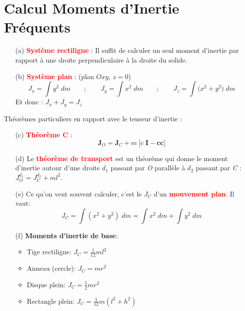 \documentclass[a4paper]{article}
\begin{document}
\section{Calcul Moments d'Inertie Fréquents}





\begin{enumerate}

\item[(a)] \textcolor{red}{\textbf{Système rectiligne}} : Il suffit de calculer un seul moment d'inertie par rapport à une droite perpendiculaire à la droite du solide.

\item[(b)] \textcolor{red}{\textbf{Système plan}} : (plan $ Oxy $, $ z = 0 $)
\[ J_x = \int y^2 \; d m \qquad ; \qquad J_y = \int x^2 \; d m \qquad ; \qquad J_z = \int \Big( x^2 + y^2 \Big) \; d m \]
Et donc : $\displaystyle J_x + J_y = J_z $

\end{enumerate}





Théorèmes particuliers en rapport avec le tenseur d'inertie : 
\begin{enumerate}

\item[(c)] \textcolor{red}{\textbf{Théorème C}} : 
\[ \textbf{J}_O = \textbf{J}_C + m \; \Big[ c \; \textbf{I} - \textbf{c} \textbf{c} \Big] \]

\item[(d)] Le \textcolor{red}{\textbf{théorème de transport}} est un théorème qui donne le moment d'inertie autour d'une droite $ d_1 $ passant par \emph{O} parallèle à $ d_2 $ passant par \emph{C} : $\displaystyle J_O^{d_1} = J_C^{d_2} + m l^2 $.

\item[(e)] Ce qu'on veut souvent calculer, c'est le $ J_C $ d'un \textcolor{red}{\textbf{mouvement plan}}. Il vaut: 
\[ J_C = \int (x^2 + y^2) \; d m = \int x^2 \; d m + \int y^2 \; d m \]

\item[(f)] \textbf{Moments d'inertie de base}:
\begin{itemize}
    \item Tige rectiligne: $\displaystyle J_C = \frac{1}{12} m l^2 $
    \item Anneau (cercle): $\displaystyle J_C = m r^2 $
    \item Disque plein: $\displaystyle J_C = \frac{1}{2} m r^2 $
    \item Rectangle plein: $\displaystyle J_C = \frac{1}{12} m (l^2 + h^2) $
\end{itemize}

\end{enumerate}
\end{document}

